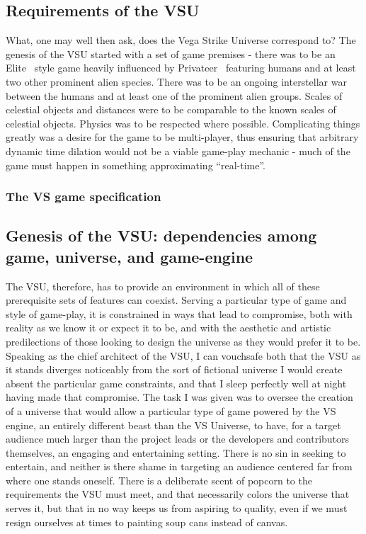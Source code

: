 \subsection{Requirements of the VSU}
What, one may well then ask, does the Vega Strike Universe correspond
to? The genesis of the VSU started with a set of game premises - there
was to be an Elite~\cite{Elite} style game heavily influenced by
Privateer~\cite{Privateer} featuring humans and at least two other
prominent alien species. There was to be an ongoing interstellar war
between the humans and at least one of the prominent alien
groups. Scales of celestial objects and distances were to be
comparable to the known scales of celestial objects. Physics was to be
respected where possible. Complicating things greatly was a desire for
the game to be multi-player, thus ensuring that arbitrary dynamic time
dilation would not be a viable game-play mechanic - much of the game
must happen in something approximating ``real-time''.



\subsubsection{The VS game specification}
\label{Danny's stuff goes here}





\subsection{Genesis of the VSU: dependencies among game, universe, and game-engine}
The VSU, therefore, has to provide an environment in which all of
these prerequisite sets of features can coexist. Serving a particular
type of game and style of game-play, it is constrained in ways that
lead to compromise, both with reality as we know it or expect it to
be, and with the aesthetic and artistic predilections of those looking
to design the universe as they would prefer it to be. Speaking as the
chief architect of the VSU, I can vouchsafe both that the VSU as it
stands diverges noticeably from the sort of fictional universe I would
create absent the particular game constraints, and that I sleep
perfectly well at night having made that compromise. The task I was
given was to oversee the creation of a universe that would allow a
particular type of game powered by the VS engine, an entirely
different beast than the VS Universe, to have, for a target audience
much larger than the project leads or the developers and contributors
themselves, an engaging and entertaining setting. There is no sin in
seeking to entertain, and neither is there shame in targeting an
audience centered far from where one stands oneself. There is a
deliberate scent of popcorn to the requirements the VSU must meet, and
that necessarily colors the universe that serves it, but that in no
way keeps us from aspiring to quality, even if we must resign
ourselves at times to painting soup cans instead of canvas.


